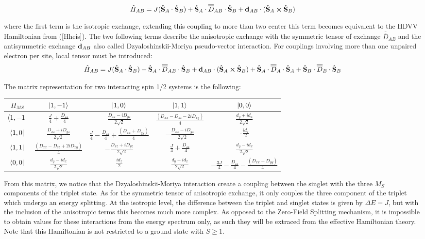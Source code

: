 \documentclass[10pt]{report}
\numberwithin{equation}{section}
\begin{document}
\begin{equation}
    \hat{H}_{AB}=J(\hat{\vb S}_A \cdot \hat{\vb S}_B) + \hat{\vb S}_A \cdot\overline{\overline{D}}_{AB} \cdot \hat{\vb S}_B + \vb{d}_{AB} \cdot (\hat{\vb S}_A \cross \hat{\vb S}_B)
\end{equation}

where the first term is the isotropic exchange, extending this coupling to more than two center this term becomes equivalent to the HDVV Hamiltonian from (\ref{Hheis}).
The two following terms describe the anisotropic exchange with the symmetric tensor of exchange $\overline{\overline{D}}_{AB}$ and the antisymmetric exchange $\vb{d}_{AB}$ also called Dzyaloshinskii-Moriya pseudo-vector interaction.
For couplings involving more than one unpaired electron per site, local tensor must be introduced:
\begin{equation}
    \hat{H}_{AB}=J(\hat{\vb S}_A \cdot \hat{\vb S}_B) + \hat{\vb S}_A \cdot\overline{\overline{D}}_{AB} \cdot \hat{\vb S}_B + \vb{d}_{AB} \cdot (\hat{\vb S}_A \cross \hat{\vb S}_B) +\hat{\vb S}_A \cdot\overline{\overline{D}}_{A} \cdot \hat{\vb S}_A +\hat{\vb S}_B \cdot\overline{\overline{D}}_{B} \cdot \hat{\vb S}_B
\end{equation}

The matrix representation for two interacting spin 1/2 systems is the following:
\begin{center}
    \begin{tabular}{c | c c c c}
        $H_{MS}$ & $\ket{1,-1}$ & $\ket{1,0}$ & $\ket{1,1}$ & $\ket{0,0}$\\
        \hline
        $\bra{1,-1}$ & $\frac{J}{4}+\frac{D_{zz}}{4}$ & $\frac{D_{xz}-iD_{yz}}{2\sqrt{2}}$ & $\frac{(D_{xx}-D_{zz}-2iD_{xy})}{4} $& $\frac{d_y+id_x}{2\sqrt{2}}$\\
        $\bra{1,0}$ & $\frac{D_{xz}+iD_{yz}}{2\sqrt{2}}$ &$ \frac{J}{4} -\frac{D_{zz}}{4} +\frac{(D_{xx}+D_{yy})}{4}$& $-\frac{D_{xz}-iD_{yz}}{2\sqrt{2}}$ & -$\frac{id_z}{2}$ \\
        $\bra{1,1}$ &$\frac{(D_{xx}-D_{zz}+2iD_{xy})}{4} $ & $-\frac{D_{xz}+iD_{yz}}{2\sqrt{2}}$ & $\frac{J}{4}+\frac{D_{zz}}{4}$ & $\frac{d_y-id_x}{2\sqrt{2}}$\\
        $\bra{0,0}$ & $\frac{d_y-id_x}{2\sqrt{2}}$  & $\frac{id_z}{2}$  &$\frac{d_y+id_x}{2\sqrt{2}}$  & $-\frac{3J}{4}-\frac{D_{zz}}{4}-\frac{(D_{xx}+D_{yy})}{4}$\\
    \end{tabular}
\end{center}
From this matrix, we notice that the Dzyaloshinskii-Moriya interaction create a coupling between the singlet with the three $M_S$ components of the triplet state.
As for the symmetric tensor of anisotropic exchange, it only couples the three component of the triplet which undergo an energy splitting.
At the isotropic level, the difference between the triplet and singlet states is given by $\Delta E=J$, but with the inclusion of the anisotropic terms this becomes much more complex. 
As opposed to the Zero-Field Splitting mechanism, it is impossible to obtain values for these interactions from the energy spectrum only, as such they will be extraced from the effective Hamiltonian theory.
Note that this Hamiltonian is not restricted to a ground state with $S\ge1$.
\end{document}
